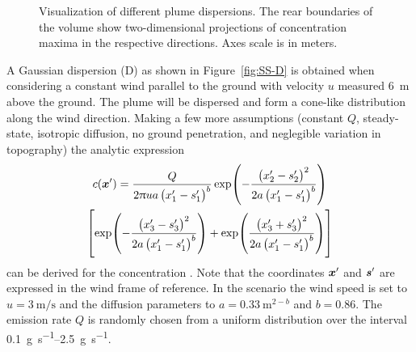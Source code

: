 \begin{figure}
    \centering
    \caption[Visualizations of plume dispersions.]{Visualization of different 
        plume dispersions. The rear boundaries of the volume show 
        two-dimensional projections of concentration maxima in the respective 
        directions. Axes scale is in meters.}
\end{figure}

A Gaussian dispersion (D) as shown in Figure~\ref{fig:SS-D} is obtained when 
considering a constant wind parallel to the ground with velocity $u$ measured 
\SI{6}{\meter} above the ground. The plume will be dispersed and form 
a cone-like distribution along the wind direction.  Making a few more 
assumptions (constant $Q$, steady-state, isotropic diffusion, no ground 
penetration, and neglegible variation in topography) the analytic expression
\begin{multline}
    c(\vc x') = \frac{Q}{2\uppi ua\del{x'_1 - s'_1}^b} 
    \exp\!\del{-\frac{\del{x'_2 - s'_2}^2}{2a\del{x'_1 - s'_1}^b}} \\ 
    \sbr{\exp\!\del{-\frac{\del{x'_3 - s'_3}^2}{2a\del{x'_1 - s'_1}^b}} 
        + \exp\!\del{\frac{\del{x'_3 + s'_3}^2}{2a\del{x'_1 - s'_1}^b}}}
\end{multline}
can be derived for the concentration \parencite{Stockie:2011fd}. Note that the 
coordinates $\bm{x}'$ and $\bm{s}'$ are expressed in the wind frame of reference.  
In the scenario the wind speed is set to $u = \SI{3}{\meter\per\second}$ and the 
diffusion parameters to $a = \SI{0.33}{\meter\tothe{2 - \mathit{b}}}$ and $b 
= 0.86$.  The emission rate $Q$ is randomly chosen from a uniform distribution 
over the interval \SIrange{0.1}{2.5}{\gram\per\second}.


